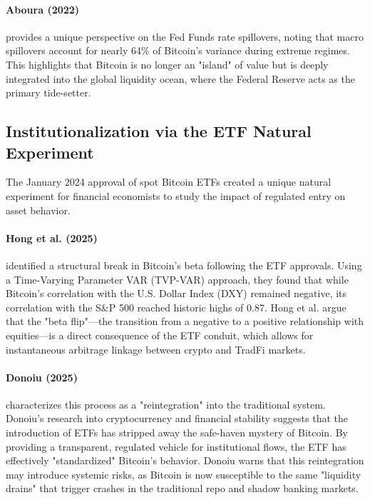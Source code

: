 \documentclass[10pt, conference, compsocconf]{IEEEtran}
\begin{document}
\paragraph{Aboura (2022)} provides a unique perspective on the Fed Funds rate spillovers, noting that macro spillovers account for nearly 64\% of Bitcoin's variance during extreme regimes. This highlights that Bitcoin is no longer an "island" of value but is deeply integrated into the global liquidity ocean, where the Federal Reserve acts as the primary tide-setter.


\subsection{Institutionalization via the ETF Natural Experiment}

The January 2024 approval of spot Bitcoin ETFs created a unique natural experiment for financial economists to study the impact of regulated entry on asset behavior.

\paragraph{Hong et al. (2025)} identified a structural break in Bitcoin's beta following the ETF approvals. Using a Time-Varying Parameter VAR (TVP-VAR) approach, they found that while Bitcoin’s correlation with the U.S. Dollar Index (DXY) remained negative, its correlation with the S\&P 500 reached historic highs of 0.87. Hong et al. argue that the "beta flip"—the transition from a negative to a positive relationship with equities—is a direct consequence of the ETF conduit, which allows for instantaneous arbitrage linkage between crypto and TradFi markets.

\paragraph{Donoiu (2025)} characterizes this process as a "reintegration" into the traditional system. Donoiu’s research into cryptocurrency and financial stability suggests that the introduction of ETFs has stripped away the safe-haven mystery of Bitcoin. By providing a transparent, regulated vehicle for institutional flows, the ETF has effectively "standardized" Bitcoin’s behavior. Donoiu warns that this reintegration may introduce systemic risks, as Bitcoin is now susceptible to the same "liquidity drains" that trigger crashes in the traditional repo and shadow banking markets.
\end{document}
